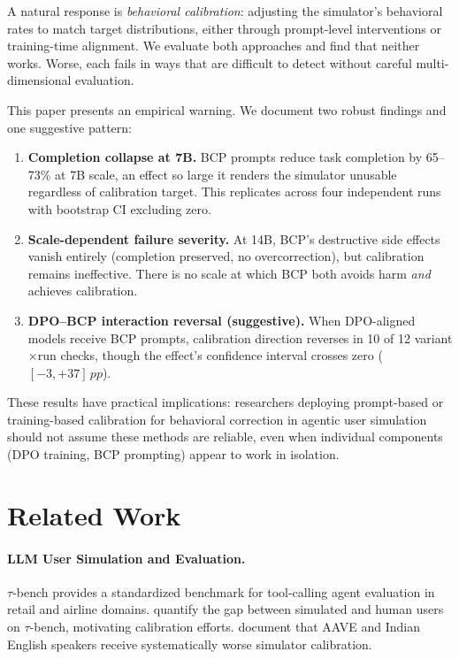 \documentclass[11pt,a4paper]{article}
\newcommand{\taubench}{$\tau$-bench}
\newcommand{\pp}{\,pp}
\begin{document}
A natural response is \emph{behavioral calibration}: adjusting the simulator's behavioral rates to match target distributions, either through prompt-level interventions or training-time alignment.
We evaluate both approaches and find that neither works.
Worse, each fails in ways that are difficult to detect without careful multi-dimensional evaluation.

This paper presents an empirical warning.
We document two robust findings and one suggestive pattern:

\begin{enumerate}
    \item \textbf{Completion collapse at 7B.} BCP prompts reduce task completion by 65--73\% at 7B scale, an effect so large it renders the simulator unusable regardless of calibration target. This replicates across four independent runs with bootstrap CI excluding zero.
    \item \textbf{Scale-dependent failure severity.} At 14B, BCP's destructive side effects vanish entirely (completion preserved, no overcorrection), but calibration remains ineffective. There is no scale at which BCP both avoids harm \emph{and} achieves calibration.
    \item \textbf{DPO--BCP interaction reversal (suggestive).} When DPO-aligned models receive BCP prompts, calibration direction reverses in 10 of 12 variant$\times$run checks, though the effect's confidence interval crosses zero ($[-3, +37]\pp$).
\end{enumerate}

These results have practical implications: researchers deploying prompt-based or training-based calibration for behavioral correction in agentic user simulation should not assume these methods are reliable, even when individual components (DPO training, BCP prompting) appear to work in isolation.

\section{Related Work}
\label{sec:related}

\paragraph{LLM User Simulation and Evaluation.}
\taubench{} \citep{yao2024taubench} provides a standardized benchmark for tool-calling agent evaluation in retail and airline domains.
\citet{sim2real2026gap} quantify the gap between simulated and human users on \taubench{}, motivating calibration efforts.
\citet{seshadri2026lost} document that AAVE and Indian English speakers receive systematically worse simulator calibration.
\end{document}

